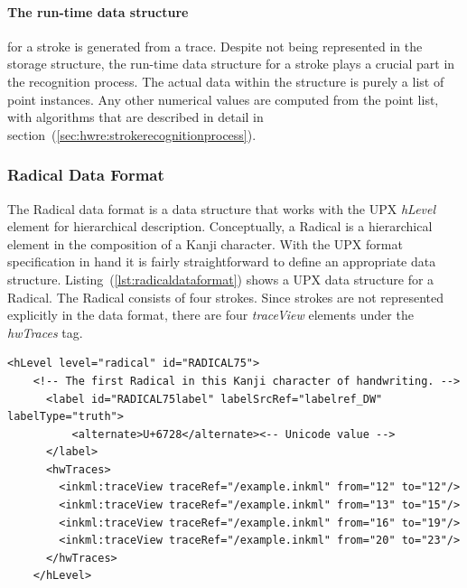 \paragraph{The run-time data structure} for a stroke is generated from a trace.
Despite not being represented in the storage structure, the run-time data
structure for a stroke plays a crucial part in the recognition process.
The actual data within the structure is purely a list of point instances. 
Any other numerical values are computed from the point list, with algorithms
that are described in detail in 
section~(\ref{sec:hwre:strokerecognitionprocess}).

\subsubsection{Radical Data Format}
\label{sec:hwre:radicaldataformat}

The Radical data format is a data structure that works with the UPX \emph{hLevel}
element for hierarchical description.
Conceptually, a Radical is a hierarchical element in the composition of a Kanji
character. With the UPX format specification in hand it is fairly 
straightforward to define an appropriate data structure.
Listing~(\ref{lst:radicaldataformat}) shows a UPX data structure for a Radical.
The Radical  consists of four strokes.
Since strokes are not represented explicitly in the data format,
there are four \emph{traceView} elements under the \emph{hwTraces} tag.
\begin{xmlcode}
  \begin{lstlisting}[emph={hLevel,hwTraces,label,alternative},
                     emphstyle=\color{blue}\textbf,
                     emph={[2]level,labelSrcRef,labelType,traceRef,from,to},
                     emphstyle={[2]\color{red}},
                     caption={A Radical representation in UPX},
                     label=lst:radicaldataformat]
    <hLevel level="radical" id="RADICAL75">
    <!-- The first Radical in this Kanji character of handwriting. -->
      <label id="RADICAL75label" labelSrcRef="labelref_DW" labelType="truth">
          <alternate>U+6728</alternate><-- Unicode value -->
      </label>
      <hwTraces>
        <inkml:traceView traceRef="/example.inkml" from="12" to="12"/>
        <inkml:traceView traceRef="/example.inkml" from="13" to="15"/>
        <inkml:traceView traceRef="/example.inkml" from="16" to="19"/>
        <inkml:traceView traceRef="/example.inkml" from="20" to="23"/>
      </hwTraces>
    </hLevel>
  \end{lstlisting}
\end{xmlcode}

